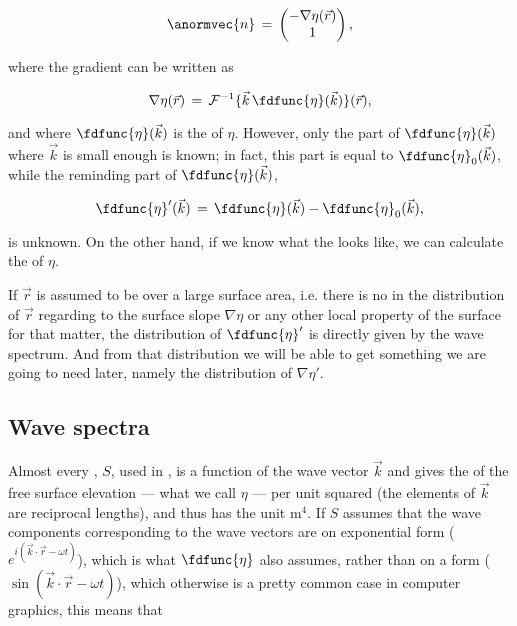 {\begin{equation}
\anormvec{n} \,=\, \left(\!\!\!\begin{array}{c}-\nabla\eta(\vec{r}) \\ 1\end{array}\!\!\!\right),
\end{equation}

where the gradient can be written as

\begin{equation}
\nabla\eta(\vec{r}) \,=\, \mathcal{F}^{-1}\{\vec{k}\,\fdfunc{\eta}(\vec{k})\}(\vec{r}),
\end{equation}

and where $\fdfunc{\eta}(\vec{k})$ is the  of $\eta$. However, only the part of $\fdfunc{\eta}(\vec{k})$ where $\vec{k}$ is small enough is known; in fact, this part is equal to $\fdfunc{\eta}_0(\vec{k})$, while the reminding part of $\fdfunc{\eta}(\vec{k})$,

\begin{equation}
\fdfunc{\eta}'(\vec{k}) \,=\, \fdfunc{\eta}(\vec{k}) - \fdfunc{\eta}_0(\vec{k}),
\end{equation}

is unknown. On the other hand, if we know what the  looks like, we can calculate the  of $\eta$.

If $\vec{r}$ is assumed to be  over a large surface area, i.e. there is no \bias in the distribution of $\vec{r}$ regarding to the surface slope $\nabla\eta$ or any other local property of the surface for that matter, the distribution of $\fdfunc{\eta}'$ is directly given by the wave spectrum. And from that distribution we will be able to get something we are going to need later, namely the distribution of $\nabla\eta'$.

\subsection{Wave spectra}

Almost every , $S$, used in , is a function of the wave vector $\vec{k}$ and gives the \variance of the free surface elevation --- what we call $\eta$ --- per unit  squared (the elements of $\vec{k}$ are reciprocal lengths), and thus has the unit $\text{m}^4$. If $S$ assumes that the wave components corresponding to the wave vectors are on exponential form ($e^{i(\vec{k}\cdot\vec{r}-\omega t)}$), which is what $\fdfunc{\eta}$ also assumes, rather than on a \sinusoidal form ($\sin(\vec{k}\cdot\vec{r}-\omega t)$), which otherwise is a pretty common case in computer graphics, this means that

}
